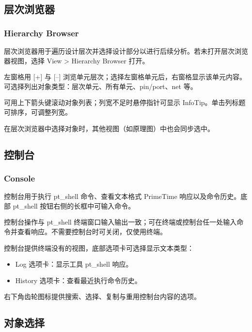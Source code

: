 
\subsection{层次浏览器}
\subsubsection*{Hierarchy Browser}

层次浏览器用于遍历设计层次并选择设计部分以进行后续分析。若未打开层次浏览器视图，选择 View > Hierarchy Browser 打开。

左窗格用 [+] 与 [–] 浏览单元层次；选择左窗格单元后，右窗格显示该单元内容。可选择列出对象类型：层次单元、所有单元、pin/port、net 等。

可用上下箭头键滚动对象列表；列宽不足时悬停指针可显示 InfoTip。单击列标题可排序，可调整列宽。

在层次浏览器中选择对象时，其他视图（如原理图）中也会同步选中。


\subsection{控制台}
\subsubsection*{Console}

控制台用于执行 pt_shell 命令、查看文本格式 PrimeTime 响应以及命令历史。底部 pt_shell 按钮右侧的长框中可输入命令。

控制台操作与 pt_shell 终端窗口输入输出一致；可在终端或控制台任一处输入命令并查看响应。不需要控制台时可关闭，仅使用终端。

控制台提供终端没有的视图，底部选项卡可选择显示文本类型：
\begin{itemize}
  \item Log 选项卡：显示工具 pt_shell 响应。
  \item History 选项卡：查看最近执行命令历史。
\end{itemize}

右下角齿轮图标提供搜索、选择、复制与重用控制台内容的选项。


\subsection{对象选择}

